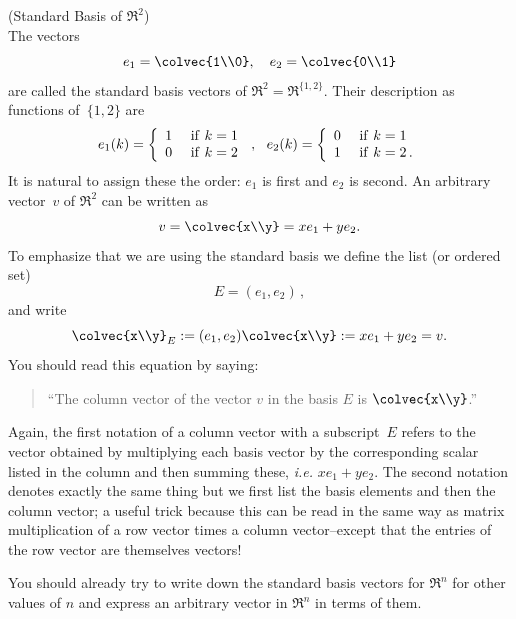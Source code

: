 \begin{example} (Standard Basis of $\Re^2$)\\
The vectors 
\[
e_1=\colvec{1\\0},~~~
e_2=\colvec{0\\1}
\]
are called the standard basis vectors of $\Re^2=\Re^{\{1,2\}}$. 
Their description as functions of~$\{1,2\}$ are 
\begin{displaymath}
   e_1 (k)= \left\{
     \begin{array}{lr}
       1 & {\rm ~if~} k=1\\
       0 & {\rm ~if~} k=2
     \end{array}
   \right. \, ,~~
   e_2 (k)= \left\{
     \begin{array}{ll}
       0 & {\rm ~if~} k=1\\
       1 & {\rm ~if~} k=2\, .
     \end{array}
   \right.
\end{displaymath} 
It is  natural to assign these  the order: $e_1$ is first and $e_2$ is second.
An arbitrary vector~$v$ of $\Re^2$ can be written as  
\[
v=\colvec{x\\y}=x e_1+ ye_2 .
\]
To emphasize that we are using the standard basis we define the list (or ordered set) \[E=(e_1,e_2)\, ,\] and write 
\[
\colvec{x\\y}_E:=(e_1,e_2)\colvec{x\\y}:=x e_1+ ye_2=v .
\]
You should read this equation by saying:
\begin{quote}
``The column vector of the vector $v$ in the basis $E$ is $\colvec{x\\y}$.''
\end{quote}

Again, the first notation of a column vector with a subscript~$E$ refers to the vector obtained by multiplying each basis vector
by the corresponding scalar listed in the column and then  summing these, {\itshape i.e.} $xe_1+y e_2$. 
The second notation denotes exactly the same thing but we first list the basis elements and then the column vector; a useful trick
because this can be read in the same way as matrix multiplication of a row vector times a column vector--except that the entries of the row vector are themselves vectors! 
\end{example}

You should already try to write down the standard basis vectors for $\Re^n$ for other values of $n$ and express an arbitrary vector in $\Re^n$  in terms of them.%

